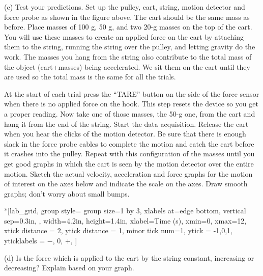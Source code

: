 (c) Test your predictions. Set up the pulley, cart, string, motion detector
and force probe as shown in the figure above. 
The cart should be the same mass as before. 
Place masses of 100 g, 50 g, and two 20-g masses on the top of the cart.
You will use these masses to create an applied force on the cart by attaching
them to the string, running the string over the pulley, and letting gravity do
the work.
The masses you hang from the string also contribute to the total mass of the 
object (cart+masses) being accelerated.
We sit them on the cart until they are used so the total mass is the same for all
the trials.

At the start of each trial press the ``TARE'' button on the side of the force sensor 
when there is no applied force on the hook.
This step resets the device so you get a proper reading.
Now take one of those masses, the 50-g one, from the cart and 
hang it from the end of the string. 
Start the data acquisition.
Release the cart when you hear the clicks of the motion detector. Be sure that
there is enough slack in the force probe cables to complete the motion and catch
the cart before it crashes into the pulley. Repeat with this configuration of the
masses until you get good graphs
in which the cart is seen by the motion detector over the entire motion. Sketch
the actual velocity, acceleration and force graphs for the motion of interest
on the axes below and indicate the scale on the axes. Draw smooth graphs; don't
worry about small bumps.

\begin{lab_groupplot}*{}[lab_grid,
	group style={
		group size=1 by 3,
		xlabels at=edge bottom,
		vertical sep=0.3in,
		},
	width=4.2in,  height=1.4in,
	xlabel=Time (s),
	xmin=0, xmax=12,
	xtick distance = 2, 
	ytick distance = 1, 
	minor tick num=1,
	ytick = {-1,0,1},
	yticklabels = {$-$, 0, $+$},
	]
\nextgroupplot[
	ymin=-1,ymax=1, 
	ylabel={Velocity (m/s)},
	]
\nextgroupplot[
	ymin=-1,ymax=1, 
	ylabel={Acceleration (m/s$^2$)},
	]
\nextgroupplot[
	ymin=-1,ymax=1, 
	ylabel={Force (N)},
	]
\end{lab_groupplot}

(d) Is the force which is applied to the cart by the string constant, increasing
or decreasing? Explain based on your graph.
\answerspace{15mm}

